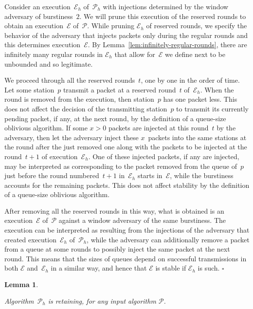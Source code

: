 \documentclass[11pt]{article}
\newcommand{\cE}{\mathcal{E}}
\newcommand{\cP}{\mathcal{P}}
\newcommand{\qed}{\hfill $\square$ \smallbreak}
\newenvironment{proof}{\noindent{\bf Proof:}}{\qed}
\newtheorem{lemma}{Lemma}
\begin{document}
\begin{proof}
Consider an execution~$\cE_{h}$ of~$\cP_h$ with injections determined by the window adversary of burstiness~$2$.
We will prune this execution of the reserved rounds to obtain an execution~$\cE$ of~$\cP$.
While pruning $\cE_{h}$ of reserved rounds, we specify the behavior of the adversary that injects packets only during the regular rounds and this determines execution~$\cE$.
By Lemma~\ref{lem:infinitely-regular-rounds}, there are infinitely many regular rounds in $\cE_{h}$ that allow for~$\cE$ we define next to be unbounded and so legitimate.

We proceed through all the reserved rounds~$t$, one by one in the order of time.
Let some station~$p$ transmit a packet at a reserved round~$t$ of~$\cE_h$.
When the round is removed from the execution, then station~$p$ has one packet less. 
This does not affect the decision of the transmitting station~$p$ to transmit its currently pending packet, if any, at the next round, by the definition of a queue-size oblivious algorithm.
If some $x>0$ packets are injected at this round~$t$ by the adversary,  then let the adversary inject these $x$~packets into the same stations at the round after the just removed one along with the packets to be injected at the round~$t+1$ of execution~$\cE_{h}$.
One of these injected packets, if any are injected, may be interpreted as corresponding to the packet removed from the queue of~$p$ just before the round numbered~$t+1$ in~$\cE_h$ starts in~$\cE$, while the burstiness accounts for the remaining packets.
This does not affect stability by the definition of a queue-size oblivious algorithm.

After removing all the reserved rounds in this way, what is obtained is an execution~$\cE$ of~$\cP$ against a window adversary of the same burstiness.
The execution can be interpreted as resulting from the injections of the adversary that created execution~$\cE_h$ of~$\cP_h$, while the adversary can additionally remove a packet from a queue at some rounds to possibly inject the same packet at the next round.
This means that the sizes of queues depend on successful transmissions in both $\cE$ and~$\cE_h$ in a similar way, and hence that $\cE$ is stable if $\cE_h$ is such.
\end{proof}



\begin{lemma}
\label{lem:retaining}

Algorithm~$\cP_{h}$ is retaining, for any input algorithm $\cP$.
\end{lemma}
\end{document}
